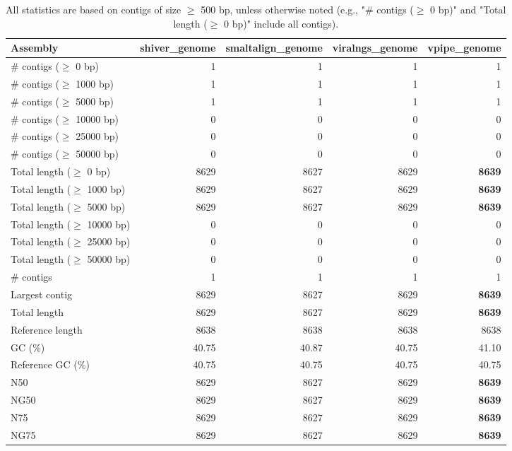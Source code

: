 \documentclass[12pt,a4paper]{article}
\begin{document}
\begin{table}[ht]
\begin{center}
\caption{All statistics are based on contigs of size $\geq$ 500 bp, unless otherwise noted (e.g., "\# contigs ($\geq$ 0 bp)" and "Total length ($\geq$ 0 bp)" include all contigs).}
\begin{tabular}{|l*{4}{|r}|}
\hline
Assembly & shiver\_genome & smaltalign\_genome & viralngs\_genome & vpipe\_genome \\ \hline
\# contigs ($\geq$ 0 bp) & 1 & 1 & 1 & 1 \\ \hline
\# contigs ($\geq$ 1000 bp) & 1 & 1 & 1 & 1 \\ \hline
\# contigs ($\geq$ 5000 bp) & 1 & 1 & 1 & 1 \\ \hline
\# contigs ($\geq$ 10000 bp) & 0 & 0 & 0 & 0 \\ \hline
\# contigs ($\geq$ 25000 bp) & 0 & 0 & 0 & 0 \\ \hline
\# contigs ($\geq$ 50000 bp) & 0 & 0 & 0 & 0 \\ \hline
Total length ($\geq$ 0 bp) & 8629 & 8627 & 8629 & {\bf 8639} \\ \hline
Total length ($\geq$ 1000 bp) & 8629 & 8627 & 8629 & {\bf 8639} \\ \hline
Total length ($\geq$ 5000 bp) & 8629 & 8627 & 8629 & {\bf 8639} \\ \hline
Total length ($\geq$ 10000 bp) & 0 & 0 & 0 & 0 \\ \hline
Total length ($\geq$ 25000 bp) & 0 & 0 & 0 & 0 \\ \hline
Total length ($\geq$ 50000 bp) & 0 & 0 & 0 & 0 \\ \hline
\# contigs & 1 & 1 & 1 & 1 \\ \hline
Largest contig & 8629 & 8627 & 8629 & {\bf 8639} \\ \hline
Total length & 8629 & 8627 & 8629 & {\bf 8639} \\ \hline
Reference length & 8638 & 8638 & 8638 & 8638 \\ \hline
GC (\%) & 40.75 & 40.87 & 40.75 & 41.10 \\ \hline
Reference GC (\%) & 40.75 & 40.75 & 40.75 & 40.75 \\ \hline
N50 & 8629 & 8627 & 8629 & {\bf 8639} \\ \hline
NG50 & 8629 & 8627 & 8629 & {\bf 8639} \\ \hline
N75 & 8629 & 8627 & 8629 & {\bf 8639} \\ \hline
NG75 & 8629 & 8627 & 8629 & {\bf 8639} \\ \hline

\end{tabular}
\end{center}
\end{table}
\end{document}
